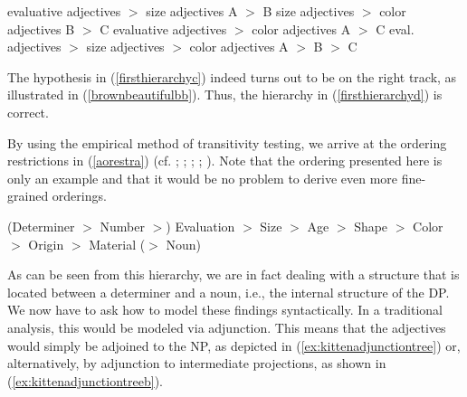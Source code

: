 \begin{exe}
\ex\label{firsthierarchy}\begin{xlist} 
\ex evaluative adjectives $>$ size adjectives \hfill A $>$ B \label{firsthierarchya}
\ex size adjectives $>$ color adjectives \hfill B $>$ C \label{firsthierarchyb} 
\ex evaluative adjectives $>$ color adjectives \hfill A $>$ C \label{firsthierarchyc}
\ex eval. adjectives $>$ size adjectives $>$ color adjectives \hfill A $>$ B $>$ C \label{firsthierarchyd}
\end{xlist}
\end{exe}


\noindent The hypothesis in (\ref{firsthierarchyc}) indeed turns out to be on the right track, as illustrated in (\ref{brownbeautifulbb}). Thus, the hierarchy in (\ref{firsthierarchyd}) is correct.

\begin{exe}
\ex\label{brownbeautifulbb}\begin{xlist} 
\end{xlist}
\end{exe}

\noindent By using the empirical method of transitivity testing, we arrive at the ordering restrictions in (\ref{aorestra}) (cf. \citealt{kingsbury1986longman}; \citealt{sproat1991cross}; \citealt{cinque1994evidence}; \citealt[1304--1308]{hole2015arguments}; \citealt[107--110]{van2017syntax}). Note that the ordering presented here is only an example and that it would be no problem to derive even more fine-grained orderings.

\begin{exe}
\ex\label{aorestra} (Determiner $>$ Number $>$) Evaluation $>$ Size $>$ Age $>$ Shape $>$ Color $>$ Origin $>$ Material ($>$ Noun)
\end{exe}

\noindent As can be seen from this hierarchy, we are in fact dealing with a structure that is located between a determiner and a noun, i.e., the internal structure of the DP. We now have to ask how to model these findings syntactically. In a traditional analysis, this would be modeled via adjunction. This means that the adjectives would simply be adjoined to the NP, as depicted in (\ref{ex:kittenadjunctiontree}) or, alternatively, by adjunction to intermediate projections, as shown in (\ref{ex:kittenadjunctiontreeb}).

\newpage 

